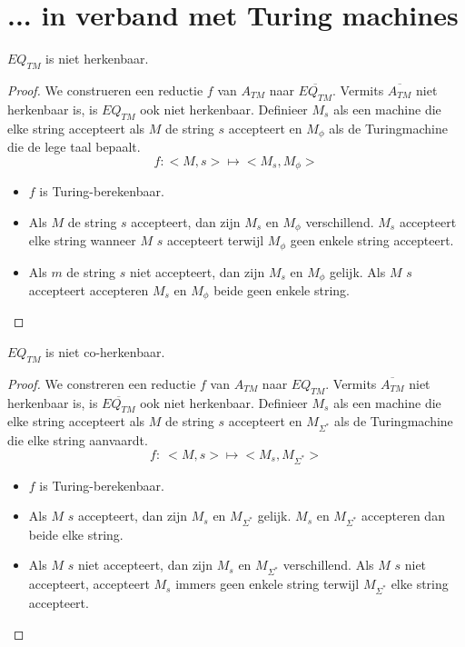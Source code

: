 \documentclass[main.tex]{subfiles}
\begin{document}
\section{...  in verband met Turing machines}
\label{sec:verb-met-tms}

\begin{st}
  \label{st:eq-tm-niet-herk}
  $EQ_{TM}$ is niet herkenbaar.

  \begin{proof}
    We construeren een reductie $f$ van $A_{TM}$ naar $\overline{EQ_{TM}}$.
    Vermits $\overline{A_{TM}}$ niet herkenbaar is, is $EQ_{TM}$ ook niet herkenbaar.
    Definieer $M_{s}$ als een machine die elke string accepteert als $M$ de string $s$ accepteert en $M_{\phi}$ als de Turingmachine die de lege taal bepaalt.
    \[ f: <M,s> \mapsto <M_{s},M_{\phi}> \]
    \begin{itemize}
    \item $f$ is Turing-berekenbaar. 
    \item Als $M$ de string $s$ accepteert, dan zijn $M_{s}$ en $M_{\phi}$ verschillend.
      $M_{s}$ accepteert elke string wanneer $M$ $s$ accepteert terwijl $M_{\phi}$ geen enkele string accepteert.
    \item Als $m$ de string $s$ niet accepteert, dan zijn $M_{s}$ en $M_{\phi}$ gelijk.
      Als $M$ $s$ accepteert accepteren $M_{s}$ en $M_{\phi}$ beide geen enkele string.
    \end{itemize}
  \end{proof}
\end{st}

\begin{st}
  \label{st:eq-tm-niet-coherk}
  $EQ_{TM}$ is niet co-herkenbaar.

  \begin{proof}
    We constreren een reductie $f$ van $A_{TM}$ naar $EQ_{TM}$.
    Vermits $\overline{A_{TM}}$ niet herkenbaar is, is $\overline{EQ_{TM}}$ ook niet herkenbaar.
    Definieer $M_{s}$ als een machine die elke string accepteert als $M$ de string $s$ accepteert en $M_{\Sigma^{*}}$ als de Turingmachine die elke string aanvaardt.
    \[ f:\ <M,s> \mapsto <M_{s},M_{\Sigma^{*}}> \]
    \begin{itemize}
    \item $f$ is Turing-berekenbaar. 
    \item Als $M$ $s$ accepteert, dan zijn $M_{s}$ en $M_{\Sigma^{*}}$ gelijk.
      $M_{s}$ en $M_{\Sigma^{*}}$ accepteren dan beide elke string.
    \item Als $M$ $s$ niet accepteert, dan zijn $M_{s}$ en $M_{\Sigma^{*}}$ verschillend.
      Als $M$ $s$ niet accepteert, accepteert $M_{s}$ immers geen enkele string terwijl $M_{\Sigma^{*}}$ elke string accepteert.
    \end{itemize}
  \end{proof}
\end{st}
\end{document}
